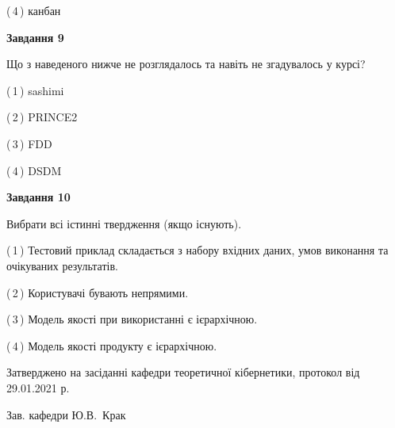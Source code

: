\documentclass[10pt, ukrainian]{article}
\begin{document}
{\begin {large}
(\,4\,) канбан%


{\begin {center}\textbf{Завдання 9}\end {center}}\par
Що з наведеного нижче не розглядалось та навіть не згадувалось у курсі?\par
\vspace{2mm}



(\,1\,) sashimi%



(\,2\,) PRINCE2%



(\,3\,) FDD%



(\,4\,) DSDM%


{\begin {center}\textbf{Завдання 10}\end {center}}\par
Вибрати всі істинні твердження (якщо існують).\par
\vspace{2mm}



(\,1\,) Тестовий приклад складається з набору вхідних даних, умов виконання та очікуваних результатів.%



(\,2\,) Користувачі бувають непрямими.%



(\,3\,) Модель якості при використанні є ієрархічною.%



(\,4\,) Модель якості продукту є ієрархічною.%



\end {large}}
{\vspace{5mm}\smallskip \begin {small} Затверджено на засіданні кафедри теоретичної кібернетики, протокол  від   29.01.2021 р.\par\smallskip\smallskip
{\parbox {6.5 cm}{Зав. кафедри \dotfill Ю.В.~Крак}} \end{small}}
\newpage
\end{document}

